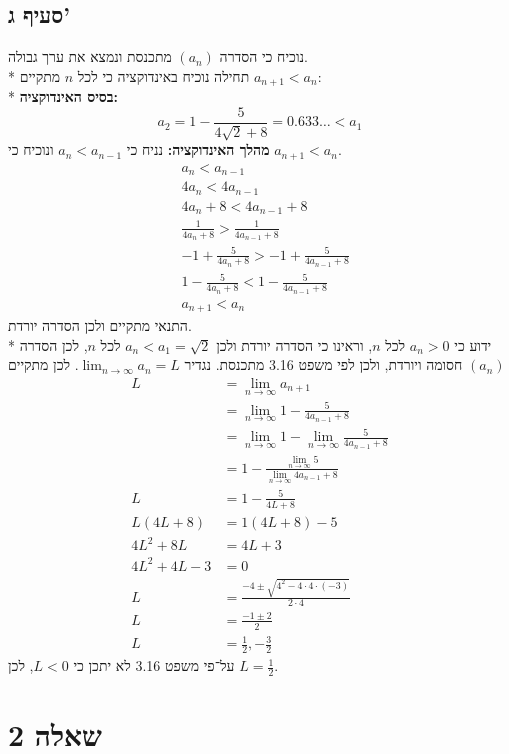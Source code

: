 \documentclass[a4paper]{article}
\begin{document}
\subsection{סעיף ג'}
נוכיח כי הסדרה $(a_n)$ מתכנסת ונמצא את ערך גבולה. \\*
תחילה נוכיח באינדוקציה כי לכל $n$ מתקיים $a_{n + 1} < a_n$: \\*
\textbf{בסיס האינדוקציה:}
\[
	a_2 = 1 - \frac{5}{4 \sqrt{2} + 8} = 0.633 \ldots < a_1
\]
\textbf{מהלך האינדוקציה:}
נניח כי $a_n < a_{n - 1}$ ונוכיח כי $a_{n + 1} < a_n$.
\begin{align*}
	& a_n < a_{n - 1} \\
	& 4 a_n < 4 a_{n - 1} \\
	& 4 a_n + 8 < 4 a_{n - 1} + 8 \\
	& \frac{1}{4 a_n + 8} > \frac{1}{4 a_{n - 1} + 8} \\
	& -1 + \frac{5}{4 a_n + 8} > -1 + \frac{5}{4 a_{n - 1} + 8} \\
	& 1 - \frac{5}{4 a_n + 8} < 1 - \frac{5}{4 a_{n - 1} + 8} \\
	& a_{n + 1} < a_n
\end{align*}
התנאי מתקיים ולכן הסדרה יורדת. \\*
ידוע כי $a_n > 0$ לכל $n$,
וראינו כי הסדרה יורדת ולכן $a_n < a_1 = \sqrt{2}$ לכל $n$,
לכן הסדרה $(a_n)$ חסומה ויורדת, ולכן לפי משפט 3.16 מתכנסת.
נגדיר $\lim_{n \to \infty} a_n = L$. לכן מתקיים
\begin{align*}
	L
	& = \lim_{n \to \infty} a_{n + 1} \\
	& = \lim_{n \to \infty} 1 - \frac{5}{4 a_{n - 1} + 8} \\
	& = \lim_{n \to \infty} 1 - \lim_{n \to \infty} \frac{5}{4 a_{n - 1} + 8} \\
	& = 1 - \frac{\lim_{n \to \infty} 5}{\lim_{n \to \infty} 4 a_{n - 1} + 8} \\
	L & = 1 - \frac{5}{4 L + 8} \\
	L (4L + 8) & = 1(4L + 8) - 5 \\
	4L^2 + 8L & = 4L + 3 \\
	4L^2 + 4L - 3 & = 0 \\
	L & = \frac{-4 \pm \sqrt{4^2 - 4 \cdot 4 \cdot (-3)}}{2 \cdot 4} \\
	L & = \frac{-1 \pm 2}{2} \\
	L & = \frac{1}{2}, -\frac{3}{2}
\end{align*}
על־פי משפט 3.16 לא יתכן כי $L < 0$, לכן $L = \frac{1}{2}$.

\section{שאלה 2}
\end{document}
